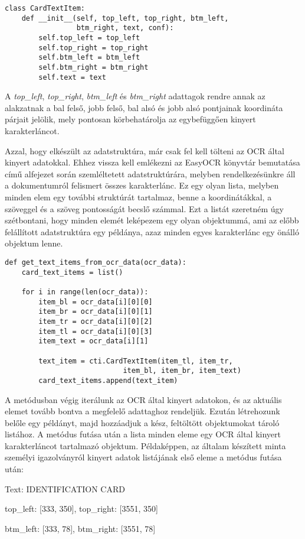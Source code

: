 \documentclass[12pt]{report}
\begin{document}
\begin{verbatim}
class CardTextItem:
    def __init__(self, top_left, top_right, btm_left,
                 btm_right, text, conf):
        self.top_left = top_left
        self.top_right = top_right
        self.btm_left = btm_left
        self.btm_right = btm_right
        self.text = text
\end{verbatim}

A \emph{top\_left}, \emph{top\_right}, \emph{btm\_left} és \emph{btm\_right} adattagok rendre annak az alakzatnak a bal felső, jobb felső, bal alsó és jobb alsó pontjainak koordináta párjait jelölik, mely pontosan körbehatárolja az egybefüggően kinyert karakterláncot.

Azzal, hogy elkészült az adatstruktúra, már csak fel kell tölteni az OCR által kinyert adatokkal. Ehhez vissza kell emlékezni az EasyOCR könyvtár bemutatása című alfejezet során szemléltetett adatstruktúrára, melyben rendelkezésünkre áll a dokumentumról felismert összes karakterlánc. Ez egy olyan lista, melyben minden elem egy további struktúrát tartalmaz, benne a koordinátákkal, a szöveggel és a szöveg pontosságát becslő számmal. Ezt a listát szeretném úgy szétbontani, hogy minden elemét leképezem egy olyan objektummá, ami az előbb felállított adatstruktúra egy példánya, azaz minden egyes karakterlánc egy önálló objektum lenne.

\begin{verbatim}
def get_text_items_from_ocr_data(ocr_data):
    card_text_items = list()

    for i in range(len(ocr_data)):
        item_bl = ocr_data[i][0][0]
        item_br = ocr_data[i][0][1]
        item_tr = ocr_data[i][0][2]
        item_tl = ocr_data[i][0][3]
        item_text = ocr_data[i][1]

        text_item = cti.CardTextItem(item_tl, item_tr, 
                            item_bl, item_br, item_text)
        card_text_items.append(text_item)
\end{verbatim}

A metódusban végig iterálunk az OCR által kinyert adatokon, és az aktuális elemet tovább bontva a megfelelő adattaghoz rendeljük. Ezután létrehozunk belőle egy példányt, majd hozzáadjuk a kész, feltöltött objektumokat tároló listához. A metódus futása után a lista minden eleme egy OCR által kinyert karakterláncot tartalmazó objektum. Példaképpen, az általam készített minta személyi igazolványról kinyert adatok listájának első eleme a metódus futása után:

\begin{tcolorbox}
    Text: IDENTIFICATION CARD

    top\_left: [333, 350], top\_right: [3551, 350]

    btm\_left: [333, 78], btm\_right: [3551, 78]
\end{tcolorbox}
\end{document}
